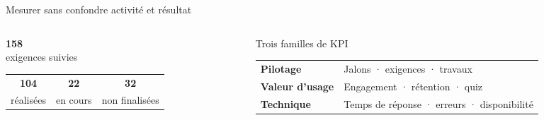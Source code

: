 \begin{frame}{Mesurer sans confondre activité et résultat}
\begin{columns}[T]
\begin{column}{0.47\linewidth}
\begin{center}
{\fontsize{30}{32}\selectfont\color{Blue}\bfseries 158}\\[-0.2em]\small exigences suivies\\[0.35em]
\begin{tabular}{ccc}
{\Large\color{Green}\bfseries 104} & {\Large\color{Orange}\bfseries 22} & {\Large\color{Muted}\bfseries 32}\\
\scriptsize réalisées & \scriptsize en cours & \scriptsize non finalisées
\end{tabular}
\end{center}
\vspace{0.35em}
\centering{}
\end{column}
\begin{column}{0.49\linewidth}
\hfill{}
\vspace{0.8em}
\begin{block}{Trois familles de KPI}
\small
\begin{tabularx}{\linewidth}{>{\bfseries}p{2.1cm}X}
Pilotage & Jalons · exigences · travaux \\
Valeur d'usage & Engagement · rétention · quiz \\
Technique & Temps de réponse · erreurs · disponibilité
\end{tabularx}
\end{block}
\vspace{0.25em}
\small{}
\end{column}
\end{columns}
\end{frame}

